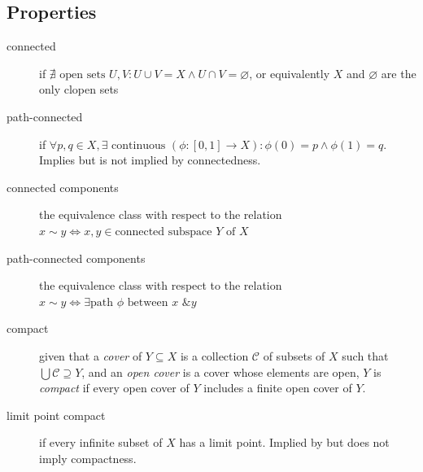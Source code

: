 \documentclass[tbtags,columns=2]{cheatsheet}
\begin{document}
\subsection{Properties}
\begin{description}
    \item[connected] if $\nexists\text{ open sets } U,V : U \cup V = X \land U \cap V = \varnothing$, or equivalently $X$ and $\varnothing$ are the only clopen sets
    \item[path-connected] if $\forall p,q \in X, \exists\text{ continuous }\left( \phi:[0,1] \to X  \right): \phi(0)=p \wedge \phi(1)=q$. Implies but is not implied by connectedness.
    \item[connected components] the equivalence class with respect to the relation $x \sim y \iff x,y \in \text{connected subspace $Y$ of $X$}$
    \item[path-connected components] the equivalence class with respect to the relation $x \sim y \iff \exists\text{path $\phi$ between $x$ \& $y$}$
    \item[compact] given that a \emph{cover} of $Y \subseteq X$ is a collection $\mathcal{C}$ of subsets of $X$ such that $\bigcup \mathcal{C} \supseteq Y$, and an \emph{open cover} is a cover whose elements are open, $Y$ is \emph{compact} if every open cover of $Y$ includes a finite open cover of $Y$.
    \item[limit point compact] if every infinite subset of $X$ has a limit point. Implied by but does not imply compactness.
\end{description}
\end{document}
